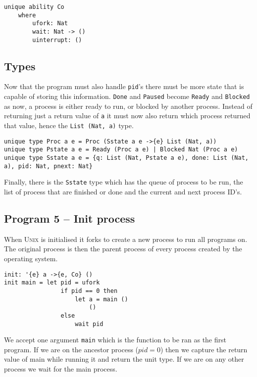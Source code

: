\documentclass[logo,bsc,singlespacing,parskip]{infthesis}
\begin{document}
\begin{lstlisting}[language=unison]
unique ability Co 
    where 
        ufork: Nat
        wait: Nat -> ()
        uinterrupt: ()
\end{lstlisting}

\subsection{Types}

Now that the program must also handle \texttt{pid}'s there must be more state
that is capable of storing this information. \texttt{Done} and \texttt{Paused}
become \texttt{Ready} and \texttt{Blocked} as now, a process is either ready to
run, or blocked by another process. Instead of returning just a return value of
\texttt{a} it must now also return which process returned that value, hence the
\texttt{List (Nat, a)} type.

\begin{lstlisting}[language=unison]
unique type Proc a e = Proc (Sstate a e ->{e} List (Nat, a))
unique type Pstate a e = Ready (Proc a e) | Blocked Nat (Proc a e)
unique type Sstate a e = {q: List (Nat, Pstate a e), done: List (Nat, a), pid: Nat, pnext: Nat}
\end{lstlisting}

Finally, there is the \texttt{Sstate} type which has the queue of process to be
run, the list of process that are finished or done and the current and next
process ID's.

\begin{tcolorbox}[colback=gray!10, colframe=black, arc=0pt, outer arc=0pt]
  \section*{Program 5 -- Init process}

  When \textsc{Unix} is initialised it forks to create a new process to run all
  programs on. The original process is then the parent process of every process
  created by the operating system.

  \begin{lstlisting}[language=unison]
init: '{e} a ->{e, Co} ()
init main = let pid = ufork
                if pid == 0 then
                    let a = main ()
                        ()
                else
                    wait pid
  \end{lstlisting}

  We accept one argument \texttt{main} which is the function to be ran as the
  first program. If we are on the ancestor process ($pid = 0$) then we capture
  the return value of main while running it and return the unit type. If we are
  on any other process we wait for the main process.
\end{tcolorbox}
\end{document}
